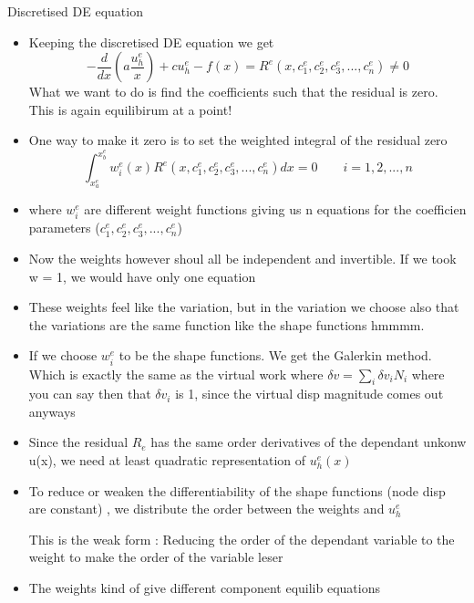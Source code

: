 	\begin{frame}{Discretised DE equation}
		\begin{itemize}
			\item Keeping the discretised DE equation we get 
				\begin{equation}
					-\frac{d}{dx}\left(a \frac{u_h^e}{x} \right) + cu_h^e -f(x) =  R^e(x,c_1^e,c_2^e,c_3^e,...,c_n^e) \neq 0  
				\end{equation}
			What we want to do is find the coefficients such that the residual is zero. This is again equilibirum at a point!
			\item One way to make it zero is to set the weighted integral of the residual zero
				\begin{equation}
					\int_{x_a^e}^{x_b^e} w_i^e(x)R^e(x,c_1^e,c_2^e,c_3^e,...,c_n^e)  dx = 0 \qquad i = 1,2,...,n
				\end{equation}
			\item where $w_i^e$ are different weight functions giving us n equations for the coefficien parameters ($c_1^e,c_2^e,c_3^e,...,c_n^e$)
			\item Now the weights however shoul all be independent and invertible. If we took w = 1, we would have only one equation
			\item These weights feel like the variation, but in the variation we choose also that the variations are the same function like the shape functions hmmmm.
		\end{itemize}
	\end{frame}


	\begin{frame}
		\begin{itemize}
			\item If we choose $w^e_i$ to be the shape functions. We get the Galerkin method. Which is exactly the same as the virtual work where $\delta v = \sum_{i}\delta v_i N_i$ where you can say then that $\delta v_i$ is 1, since the virtual disp magnitude comes out anyways
			\item Since the residual $R_e$ has the same order derivatives of the dependant unkonw u(x), we need at least quadratic representation of $u_h^e(x)$
			\item To reduce or weaken the differentiability of the shape functions (node disp are constant) , we distribute the order between the weights and $u_h^e$ 
			\begin{block}{}
				This is the weak form : Reducing the order of the dependant variable to the weight to make the order of the variable leser
			\end{block}
			\item The weights kind of give different component equilib equations
		\end{itemize}
	\end{frame}


